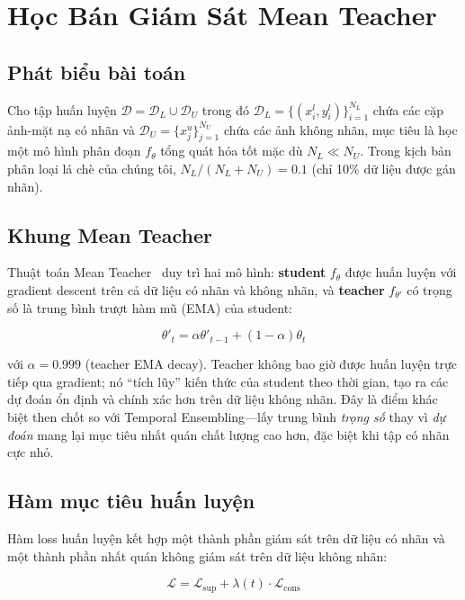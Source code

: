 \documentclass[conference]{IEEEtran}
\begin{document}
\section{Học Bán Giám Sát Mean Teacher}

\subsection{Phát biểu bài toán}

Cho tập huấn luyện $\mathcal{D} = \mathcal{D}_L \cup \mathcal{D}_U$ trong đó $\mathcal{D}_L = \{(x_i^l, y_i^l)\}_{i=1}^{N_L}$ chứa các cặp ảnh-mặt nạ có nhãn và $\mathcal{D}_U = \{x_j^u\}_{j=1}^{N_U}$ chứa các ảnh không nhãn, mục tiêu là học một mô hình phân đoạn $f_\theta$ tổng quát hóa tốt mặc dù $N_L \ll N_U$. Trong kịch bản phân loại lá chè của chúng tôi, $N_L / (N_L + N_U) = 0.1$ (chỉ 10\% dữ liệu được gán nhãn).

\subsection{Khung Mean Teacher}

Thuật toán Mean Teacher~\cite{b4} duy trì hai mô hình: \textbf{student} $f_\theta$ được huấn luyện với gradient descent trên cả dữ liệu có nhãn và không nhãn, và \textbf{teacher} $f_{\theta'}$ có trọng số là trung bình trượt hàm mũ (EMA) của student:

\begin{equation}
\theta'_t = \alpha \theta'_{t-1} + (1 - \alpha) \theta_t
\end{equation}

với $\alpha = 0.999$ (teacher EMA decay). Teacher không bao giờ được huấn luyện trực tiếp qua gradient; nó ``tích lũy'' kiến thức của student theo thời gian, tạo ra các dự đoán ổn định và chính xác hơn trên dữ liệu không nhãn. Đây là điểm khác biệt then chốt so với Temporal Ensembling---lấy trung bình \textit{trọng số} thay vì \textit{dự đoán} mang lại mục tiêu nhất quán chất lượng cao hơn, đặc biệt khi tập có nhãn cực nhỏ.

\subsection{Hàm mục tiêu huấn luyện}

Hàm loss huấn luyện kết hợp một thành phần giám sát trên dữ liệu có nhãn và một thành phần nhất quán không giám sát trên dữ liệu không nhãn:

\begin{equation}
\mathcal{L} = \mathcal{L}_{\text{sup}} + \lambda(t) \cdot \mathcal{L}_{\text{cons}}
\end{equation}
\end{document}
